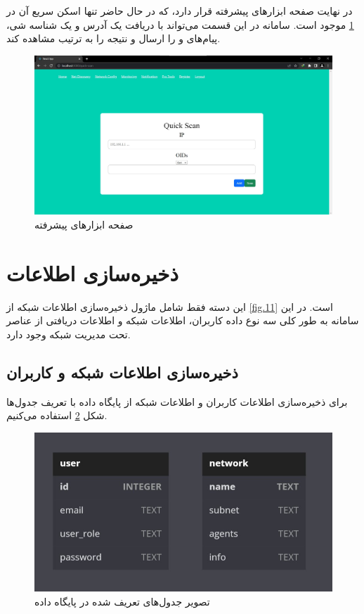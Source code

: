 \cleardoublepage

در نهایت صفحه ابزارهای پیشرفته قرار دارد، که در حال حاضر تنها اسکن سریع آن در \cref{fig.120} موجود است. سامانه در این قسمت می‌تواند با دریافت یک آدرس و یک شناسه شی، پیام‌های  و  را ارسال و نتیجه را به ترتیب مشاهده کند. 

\begin{figure}[!h]
    \centering\includegraphics[scale=.38]{./pro-tools}
    \caption{صفحه ابزارهای پیشرفته}\label{fig.120}
\end{figure}



\cleardoublepage

\section{ذخیره‌سازی اطلاعات}

این دسته فقط شامل ماژول ذخیره‌سازی اطلاعات شبکه از \cref{fig.11} است. در این سامانه به طور کلی سه نوع داده کاربران، اطلاعات شبکه و اطلاعات دریافتی از عناصر تحت مدیریت شبکه وجود دارد. 



\subsection{ذخیره‌سازی اطلاعات شبکه و کاربران}

برای ذخیره‌سازی اطلاعات کاربران و اطلاعات شبکه از پایگاه داده  با تعریف جدول‌ها شکل \cref{fig.121} استفاده می‌کنیم.

\begin{figure}[!h]
    \centering\includegraphics[scale=.60]{./db}
    \caption{تصویر جدول‌های تعریف شده در پایگاه داده }\label{fig.121}
\end{figure}


